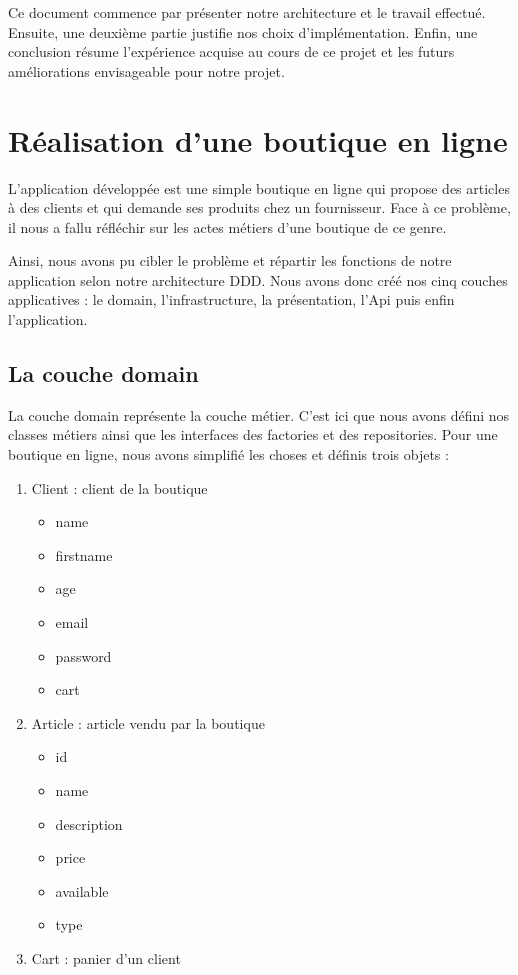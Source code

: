 \documentclass[a4paper]{article}
\begin{document}
    \bigskip
    
    Ce document commence par présenter notre architecture et le travail effectué. Ensuite, une deuxième partie justifie nos choix d'implémentation. Enfin, une conclusion résume l'expérience acquise au cours de ce projet et les futurs améliorations envisageable pour notre projet.

\newpage

\section{Réalisation d'une boutique en ligne }
   L'application développée est une simple boutique en ligne qui propose des articles à des clients et qui demande ses produits chez un fournisseur. Face à ce problème, il nous a fallu réfléchir sur les actes métiers d'une boutique de ce genre. 
   
   \bigskip
   
   Ainsi, nous avons pu cibler le problème et répartir les fonctions de notre application selon notre architecture DDD. Nous avons donc créé nos cinq couches applicatives : le domain, l'infrastructure, la présentation, l'Api puis enfin l'application.

\subsection{La couche domain}
    La couche domain représente la couche métier. C'est ici que nous avons défini nos classes métiers ainsi que les interfaces des factories et des repositories. Pour une boutique en ligne, nous avons simplifié les choses et définis trois objets :
    
    \bigskip
    
    \begin{enumerate}
        \item Client : client de la boutique
        \begin{itemize}
            \item name
            \item firstname
            \item age
            \item email
            \item password
            \item cart
        \end{itemize}
        
        \item Article : article vendu par la boutique
            \begin{itemize}
            \item id
            \item name
            \item description
            \item price
            \item available
            \item type
        \end{itemize}
        \item Cart : panier d'un client
    \end{enumerate}
    
\end{document}

